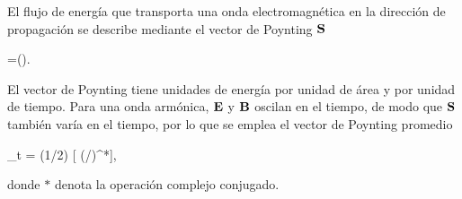 El flujo de energía que transporta una onda electromagnética en la dirección de propagación se describe mediante el vector de Poynting  $\vb{S}$ \cite{jacksonClassicalElectrodynamics2021a}
\begin{tcolorbox}
	=(\times{}).
	\label{eq:vect_Poynting} 
\end{tcolorbox}
\noindent El vector de Poynting tiene unidades de energía por unidad de área y por unidad de tiempo. Para una onda armónica, $\vb{E}$ y $\vb{B}$ oscilan en el tiempo, de modo que $\vb{S}$ también varía en el tiempo, por lo que se emplea el vector de Poynting promedio \cite{bohrenAbsorptionScatteringLight2008}
\begin{tcolorbox}
	\langle{}\rangle_t = (1/2) [ \times (/\mu)^{*}],
	\label{eq:vect_Poynting_prom_arm} 
\end{tcolorbox}
\noindent donde $*$ denota la operación complejo conjugado.














